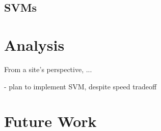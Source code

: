 \documentclass[preprint]{acm_proc_article-sp}
\begin{document}
%
%

\subsection{SVMs}

%
%

\section{Analysis}
From a site's perspective, ...

- plan to implement SVM, despite speed tradeoff 

\section{Future Work}
\end{document}
